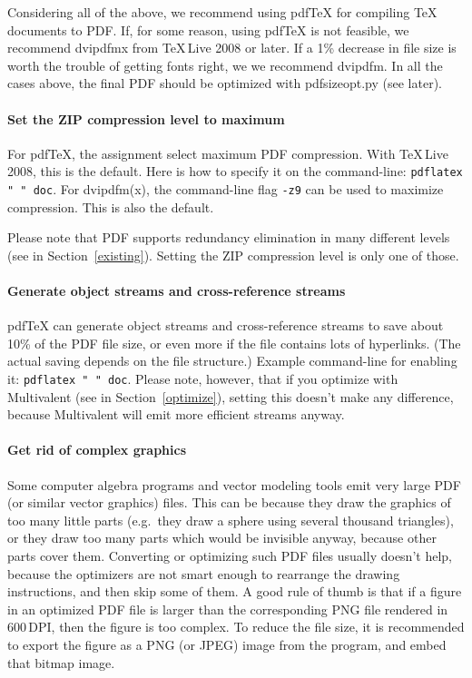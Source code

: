 \documentclass{ltugproc}
\def\cmd{\textsf}
\begin{document}
Considering all of the above, we recommend using pdf\TeX{} for compiling
\TeX{} documents to PDF. If, for some
reason, using pdf\TeX{} is not feasible, we recommend \cmd{dvipdfmx} from
\TeX{}\,Live 2008 or later. If a 1\% decrease in file size is worth the
trouble of getting fonts right, we we recommend \cmd{dvipdfm}.
In all the cases above, the final PDF should be optimized with
\cmd{pdfsizeopt.py} (see later).

\paragraph{Set the ZIP compression level to maximum}

For pdf\TeX{}, the assignment \texttt{\string{}} select
maximum PDF compression. With \TeX{}\,Live 2008, this is the default. Here
is how to specify it on the command-line:
\texttt{pdflatex "\string{} \string" doc}.
For \cmd{dvipdfm(x)}, the command-line flag \texttt{-z9} can be used to
maximize compression. This is also the default.

Please note that PDF supports redundancy elimination in many different
levels (see in Section~\ref{existing}). Setting the ZIP compression level is
only one of those.

\paragraph{Generate object streams and cross-reference streams}

pdf\TeX{} can generate object streams and cross-reference streams to save
about 10\% of the PDF file size, or even more if the file contains lots of
hyperlinks. (The actual saving depends on the file
structure.) Example command-line for enabling it:
\texttt{pdflatex "\string{} \string{}
\string" doc}. Please note, however, that if you optimize with
Multivalent (see in Section~\ref{optimize}), setting this doesn't
make any difference, because Multivalent will emit more efficient streams
anyway.

\paragraph{Get rid of complex graphics}

Some computer algebra programs and vector modeling tools emit very large
PDF (or similar vector graphics) files. This can be because they draw the
graphics of too many little parts (e.g.\ they draw a sphere using several
thousand triangles), or they draw too many parts which would
be invisible anyway, because other parts cover them. Converting or
optimizing such PDF files usually doesn't help, because the optimizers are not
smart enough to rearrange the drawing instructions, and then skip some of
them. A good rule of thumb is that if a figure in an optimized PDF file is
larger than the corresponding PNG file rendered in 600\,DPI, then the
figure is too complex. To reduce the file size, it is recommended to 
export the figure as a PNG (or JPEG) image from the program, and embed that
bitmap image.
\end{document}
